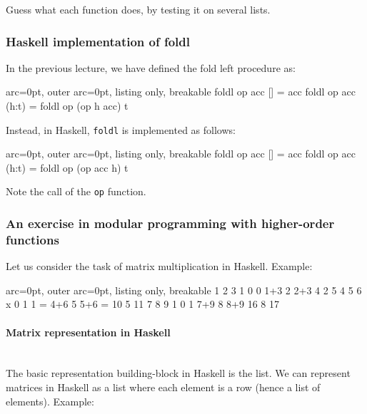 Guess what each function does, by testing it on several lists.

\subsubsection*{ Haskell implementation of foldl }

In the previous lecture, we have defined the fold left procedure as:


\begin{tcblisting}{ arc=0pt, outer arc=0pt, listing only, breakable}
foldl op acc []     = acc                  
foldl op acc (h:t) = foldl op (op h acc) t

\end{tcblisting}


Instead, in Haskell, \texttt{foldl} is implemented as follows:

\begin{tcblisting}{ arc=0pt, outer arc=0pt, listing only, breakable}
foldl op acc []     = acc                  
foldl op acc (h:t) = foldl op (op acc h) t

\end{tcblisting}


Note the call of the \texttt{op} function.

\subsubsection*{ An exercise in modular programming with higher-order functions }

Let us consider the task of matrix multiplication in Haskell. Example:

\begin{tcblisting}{ arc=0pt, outer arc=0pt, listing only, breakable}
  1   2   3            1   0   0         1+3  2  2+3      4   2   5
  4   5   6      x     0   1   1     =   4+6  5  5+6  =   10  5   11
  7   8   9            1   0   1         7+9  8  8+9      16  8   17

\end{tcblisting}



\paragraph{ Matrix representation in Haskell }\hfill\\

The basic representation building-block in Haskell is the list. We can represent matrices in Haskell as a list where each element is a row (hence a list of elements). Example:


